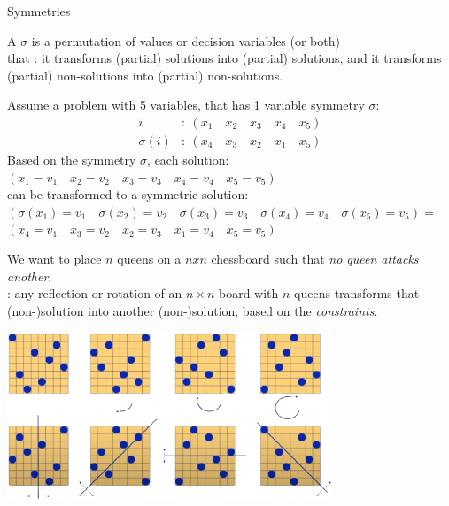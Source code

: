 \documentclass{cons-beamer}
\begin{document}
\begin{frame}{Symmetries}
  \begin{definition}%
    A  $\sigma$ is a permutation of values or decision
    variables (or both) \\ that : it
    transforms (partial) solutions into (partial) solutions, and it
    transforms (partial) non-solutions into (partial) non-solutions.
  \end{definition}
  \vfill

  \begin{example}
    \footnotesize
    Assume a problem with 5 variables, that has 1 variable symmetry $\sigma$:
    \[
    \begin{aligned}
      i &: \ (x_1 \quad x_2 \quad x_3 \quad x_4 \quad x_5) \\
      \sigma(i) &: \ (x_4 \quad x_3 \quad x_2 \quad x_1 \quad x_5)
    \end{aligned}
    \]
    Based on the symmetry $\sigma$, each solution: 
    $(x_1=v_1 \quad x_2=v_2 \quad x_3=v_3 \quad x_4=v_4 \quad x_5=v_5)$
    \\[+5pt]
    can be transformed to a symmetric solution: \\
    $(\sigma(x_1)=v_1 \quad \sigma(x_2)=v_2 \quad \sigma(x_3)=v_3 \quad \sigma(x_4)=v_4 \quad \sigma(x_5)=v_5) =$
    $(x_4=v_1 \quad x_3=v_2 \quad x_2=v_3 \quad x_1=v_4 \quad x_5=v_5)$
  \end{example}
\end{frame}

\begin{frame}
  \begin{example}
    We want to place $n$ queens on a $nxn$ chessboard such that \textit{no queen attacks another}. \\[+5pt]
    
    : any
    reflection or rotation of an $n \times n$ board with $n$ queens transforms that (non-)solution into another (non-)solution, based on the \textit{constraints}.
  \end{example}

  \begin{center}
    \includegraphics[height=50mm]{images/nqueens3.png}%
  \end{center}    
\end{frame}
\end{document}
